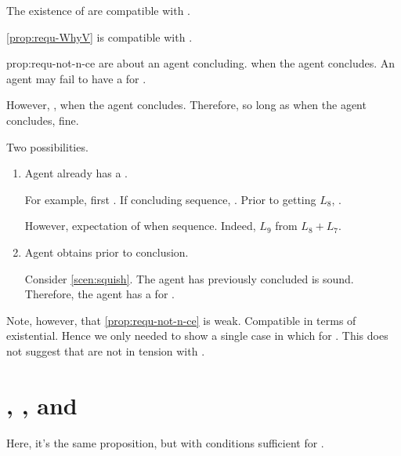 \begin{note}
  The existence of  are compatible with \issueConstraint{}.

  \begin{observation}%
    \label{prop:requ-not-n-ce}%
    \autoref{prop:requ-WhyV} is compatible with \issueConstraint{}.
  \end{observation}

  \begin{motivation}{prop:requ-not-n-ce}
     are about an agent concluding.
    \fc{} when the agent concludes.
    An agent may fail to have a \wit{} for \fc{}.

    However, \issueConstraint{}, \wit{} when the agent concludes.
    Therefore, so long as \wit{} when the agent concludes, fine.

    Two possibilities.
    \begin{enumerate}
    \item
      Agent already has a \wit{}.

      For example, first .
      If concluding sequence, \fc{}.
      Prior to getting \(L_{8}\), \fc{}.

      However, expectation of \wit{} when sequence.
      Indeed, \(L_{9}\) from \(L_{8} + L_{7}\).
    \item
      Agent obtains \wit{} prior to conclusion.

      Consider \autoref{scen:squish}.
      The agent has previously concluded \sqE{} is sound.
      Therefore, the agent has a \wit{} for \ros{}.
    \end{enumerate}
  \end{motivation}

  Note, however, that \autoref{prop:requ-not-n-ce} is weak.
  Compatible in terms of existential.
  Hence we only needed to show a single case in which \wit{} for \requ{}.
  This does not suggest that  are not in tension with \issueConstraint{}.
\end{note}

\section{, \qWhyV{}, and \issueConstraint{}}
\label{sec:tpyically-concluding}

\begin{note}
  Here, it's the same proposition, but with conditions sufficient for \requ{}.
\end{note}

